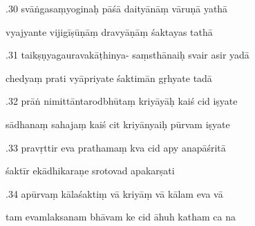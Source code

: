 \documentclass[article,12pt,a4paper]{memoir}%
\newcounter{parCount}
\begin{document}
	  
	  \pstart {}.30 svāṅgasaṃyoginaḥ pāśā daityānāṃ vāruṇā yathā 
	{}
	\pend%
      

	  
	  \pstart \leavevmode%
	vyajyante vijigīṣūṇāṃ dravyāṇāṃ śaktayas tathā 
	{}
	\pend%
      

	  
	  \pstart {}.31 taikṣṇyagauravakāṭhinya- saṃsthānaiḥ svair asir yadā 
	{}
	\pend%
      

	  
	  \pstart \leavevmode%
	chedyaṃ prati vyāpriyate śaktimān gṛhyate tadā 
	{}
	\pend%
      

	  
	  \pstart {}.32 prāṅ nimittāntarodbhūtaṃ kriyāyāḥ kaiś cid iṣyate 
	{}
	\pend%
      

	  
	  \pstart \leavevmode%
	sādhanaṃ sahajaṃ kaiś cit kriyānyaiḥ pūrvam iṣyate 
	{}
	\pend%
      

	  
	  \pstart {}.33 pravṛttir eva prathamaṃ kva cid apy anapāśritā 
	{}
	\pend%
      

	  
	  \pstart \leavevmode%
	śaktīr ekādhikaraṇe srotovad apakarṣati 
	{}
	\pend%
      

	  
	  \pstart {}.34 apūrvaṃ kālaśaktiṃ vā kriyāṃ vā kālam eva vā 
	{}
	\pend%
      

	  
	  \pstart \leavevmode%
	tam evamlaksanam bhāvam ke cid āhuh katham ca na 
	{}
	\pend%
      
\end{document}

